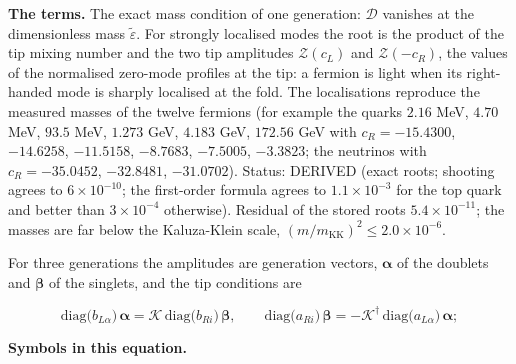 \documentclass[
  10pt,
]{article}
\begin{document}
\textbf{The terms.} The exact mass condition of one generation:
\(\mathcal{D}\) vanishes at the dimensionless mass
\(\tilde\varepsilon\). For strongly localised modes the root is the
product of the tip mixing number and the two tip amplitudes
\(\mathcal{Z}(c_L)\) and \(\mathcal{Z}(-c_R)\), the values of the
normalised zero-mode profiles at the tip: a fermion is light when its
right-handed mode is sharply localised at the fold. The localisations
reproduce the measured masses of the twelve fermions (for example the
quarks \(2.16\) MeV, \(4.70\) MeV, \(93.5\) MeV, \(1.273\) GeV,
\(4.183\) GeV, \(172.56\) GeV with \(c_R = -15.4300\), \(-14.6258\),
\(-11.5158\), \(-8.7683\), \(-7.5005\), \(-3.3823\); the neutrinos with
\(c_R = -35.0452\), \(-32.8481\), \(-31.0702\)). Status: DERIVED (exact
roots; shooting agrees to \(6\times10^{-10}\); the first-order formula
agrees to \(1.1\times10^{-3}\) for the top quark and better than
\(3\times10^{-4}\) otherwise). Residual of the stored roots
\(5.4\times10^{-11}\); the masses are far below the Kaluza-Klein scale,
\((m/m_{\mathrm{KK}})^2 \le 2.0\times10^{-6}\).

For three generations the amplitudes are generation vectors,
\(\boldsymbol{\alpha}\) of the doublets and \(\boldsymbol{\beta}\) of
the singlets, and the tip conditions are

\[
\mathrm{diag}\big(b_{L\alpha}\big)\,\boldsymbol{\alpha} = \mathcal{K}\,\mathrm{diag}\big(b_{Ri}\big)\,\boldsymbol{\beta},\qquad
\mathrm{diag}\big(a_{Ri}\big)\,\boldsymbol{\beta} = -\mathcal{K}^\dagger\,\mathrm{diag}\big(a_{L\alpha}\big)\,\boldsymbol{\alpha};
\]

\textbf{Symbols in this equation.}
\end{document}

